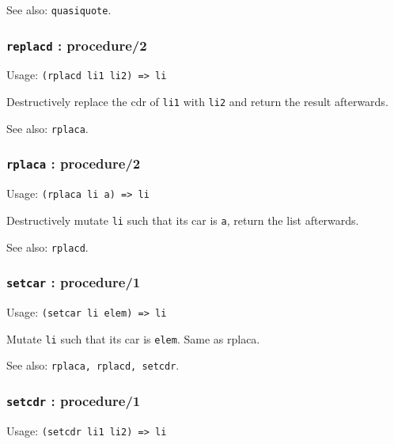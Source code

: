 \documentclass[
]{article}
\newcommand{\passthrough}[1]{#1}
\begin{document}
See also: \passthrough{\lstinline!quasiquote!}.

\hypertarget{replacd-procedure2}{%
\subsubsection{\texorpdfstring{\texttt{replacd} :
procedure/2}{replacd : procedure/2}}\label{replacd-procedure2}}

Usage: \passthrough{\lstinline!(rplacd li1 li2) => li!}

Destructively replace the cdr of \passthrough{\lstinline!li1!} with
\passthrough{\lstinline!li2!} and return the result afterwards.

See also: \passthrough{\lstinline!rplaca!}.

\hypertarget{rplaca-procedure2}{%
\subsubsection{\texorpdfstring{\texttt{rplaca} :
procedure/2}{rplaca : procedure/2}}\label{rplaca-procedure2}}

Usage: \passthrough{\lstinline!(rplaca li a) => li!}

Destructively mutate \passthrough{\lstinline!li!} such that its car is
\passthrough{\lstinline!a!}, return the list afterwards.

See also: \passthrough{\lstinline!rplacd!}.

\hypertarget{setcar-procedure1}{%
\subsubsection{\texorpdfstring{\texttt{setcar} :
procedure/1}{setcar : procedure/1}}\label{setcar-procedure1}}

Usage: \passthrough{\lstinline!(setcar li elem) => li!}

Mutate \passthrough{\lstinline!li!} such that its car is
\passthrough{\lstinline!elem!}. Same as rplaca.

See also: \passthrough{\lstinline!rplaca, rplacd, setcdr!}.

\hypertarget{setcdr-procedure1}{%
\subsubsection{\texorpdfstring{\texttt{setcdr} :
procedure/1}{setcdr : procedure/1}}\label{setcdr-procedure1}}

Usage: \passthrough{\lstinline!(setcdr li1 li2) => li!}
\end{document}
